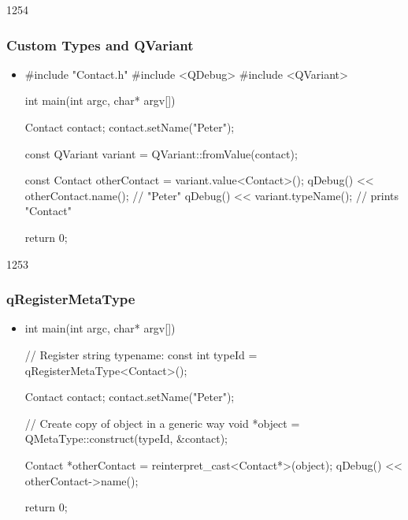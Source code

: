\begin{slide}[fragile]{1254}
\frametitle{Custom Types and QVariant}

\begin{itemize}
\item[]
\begin{cpp}
#include "Contact.h"
#include <QDebug>
#include <QVariant>

int main(int argc, char* argv[])
{
    Contact contact;
    contact.setName("Peter");

    const QVariant variant = QVariant::fromValue(contact);

    const Contact otherContact = variant.value<Contact>();
    qDebug() << otherContact.name(); // "Peter"
    qDebug() << variant.typeName();  // prints "Contact"

    return 0;
}
\end{cpp}
\end{itemize}
\end{slide}

\begin{slide}[fragile]{1253}
\frametitle{qRegisterMetaType}
\begin{itemize}
\item[]
\begin{cpp}
int main(int argc, char* argv[])
{
    // Register string typename:
    const int typeId = qRegisterMetaType<Contact>();

    Contact contact;
    contact.setName("Peter");

    // Create copy of object in a generic way
    void *object = QMetaType::construct(typeId, &contact);

    Contact *otherContact = reinterpret_cast<Contact*>(object);
    qDebug() << otherContact->name();

    return 0;
}
\end{cpp}
\end{itemize}
\end{slide}

